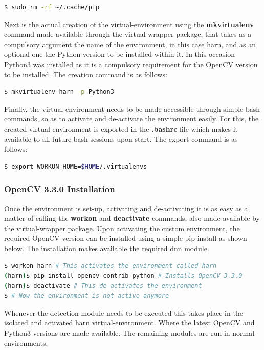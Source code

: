 \begin{lstlisting}[language=bash]
$ sudo rm -rf ~/.cache/pip
\end{lstlisting}

Next is the actual creation of the virtual-environment using the \textbf{mkvirtualenv} command made available through the virtual-wrapper package, that takes as a compulsory argument the name of the environment, in this case harn, and as an optional one the Python version to be installed within it. In this occasion Python3 was installed as it is a compulsory requirement for the OpenCV version to be installed. The creation command is as follows:

\begin{lstlisting}[language=bash]
$ mkvirtualenv harn -p Python3
\end{lstlisting}

Finally, the virtual-environment needs to be made accessible through simple bash commands, so as to activate and de-activate the environment easily. For this, the created virtual environment is exported in the \textbf{.bashrc} file which makes it available to all future bash sessions upon start. The export command is as follows:

\begin{lstlisting}[language=bash]
$ export WORKON_HOME=$HOME/.virtualenvs
\end{lstlisting}

\subsubsection{OpenCV 3.3.0 Installation}

Once the environment is set-up, activating and de-activating it is as easy as a matter of calling the \textbf{workon} and \textbf{deactivate} commands, also made available by the virtual-wrapper package. Upon activating the custom environment, the required OpenCV version can be installed using a simple pip install as shown below. The installation makes available the required dnn module.

\begin{lstlisting}[language=bash]
$ workon harn # This activates the environment called harn
(harn)$ pip install opencv-contrib-python # Installs OpenCV 3.3.0
(harn)$ deactivate # This de-activates the environment
$ # Now the environment is not active anymore
\end{lstlisting}

Whenever the detection module needs to be executed this takes place in the isolated and activated harn virtual-environment. Where the latest OpenCV and Python3 versions are made available. The remaining modules are run in normal environments.

